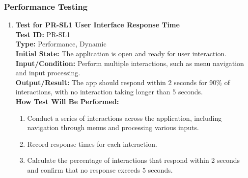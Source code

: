 \documentclass[12pt, titlepage]{article}
\begin{document}
\subsubsection{Performance Testing}
\begin{enumerate}
    \item \textbf{Test for PR-SL1 User Interface Response Time} \\
      \newline
      \textbf{Test ID:} PR-SL1 \\
      \textbf{Type:} Performance, Dynamic \\
      \textbf{Initial State:} The application is open and ready for user interaction. \\
      \textbf{Input/Condition:} Perform multiple interactions, such as menu navigation and input processing. \\
      \textbf{Output/Result:} The app should respond within 2 seconds for 90\% of interactions, with no interaction taking longer than 5 seconds. \\
      \textbf{How Test Will Be Performed:}
      \begin{enumerate}
          \item Conduct a series of interactions across the application, including navigation through menus and processing various inputs.
          \item Record response times for each interaction.
          \item Calculate the percentage of interactions that respond within 2 seconds and confirm that no response exceeds 5 seconds.
      \end{enumerate}


\end{enumerate}
\end{document}
